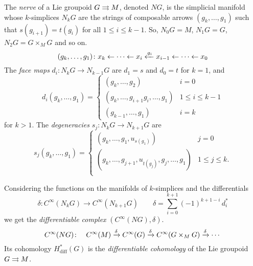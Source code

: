 %
%

The \emph{nerve} of a Lie groupoid $G\rightrightarrows M$, denoted $NG$, is the simplicial manifold whose $k$-simplices $N_kG$ are the strings of composable arrows $(g_k,\dots,g_1)$ such that $s(g_{i+1}) = t(g_i)$ for all $1\leq i\leq k-1$.
So, $N_0G = M$, $N_1G = G$, $N_2G = G\times_M G$ and so on.
\[ (g_k,\dots,g_1) \colon x_k \leftarrow \dots \leftarrow x_i \xleftarrow{g_i} x_{i-1} \leftarrow \dots \leftarrow x_0 \]
The \emph{face maps} $d_i\colon N_kG \to N_{k-1}G$ are $d_1=s$ and $d_0=t$ for $k=1$, and
\begin{equation}
d_i(g_k,\dots,g_1) =
\begin{cases}
  (g_k,\dots,g_2) & i = 0 \\
  (g_k,\dots,g_{i+1}g_i,\dots,g_1) & 1 \leq i \leq k-1 \\
  (g_{k-1},\dots,g_1) & i = k
\end{cases}
\end{equation}
for $k>1$.
The \emph{degeneracies} $s_j\colon N_kG \to N_{k+1}G$ are
\begin{equation}
s_j(g_k,\dots,g_1) =
\begin{cases}
  (g_k,\dots,g_1,u_{s(g_1)}) & j = 0 \\
  (g_k,\dots,g_{j+1},u_{t(g_j)},g_j,\dots,g_1) & 1 \leq j \leq k . \\
\end{cases}
\end{equation}

Considering the functions on the manifolds of $k$-simplices and the differentials
\[ \delta\colon C^\infty(N_kG)\to C^\infty(N_{k+1}G) \qquad \delta = \sum_{i=0}^{k+1} (-1)^{k+1-i} \, d_i^* \]
we get the \emph{differentiable complex} $(C^\infty(NG), \delta)$.
\[ C^\infty(NG)\colon \quad C^\infty(M) \xrightarrow{\delta} C^\infty(G) \xrightarrow{\delta} C^\infty(G\times_M G) \xrightarrow{\delta} \cdots \]
Its cohomology $H_\text{diff}^*(G)$  is the \emph{differentiable cohomology} of the Lie groupoid $G\rightrightarrows M$.


